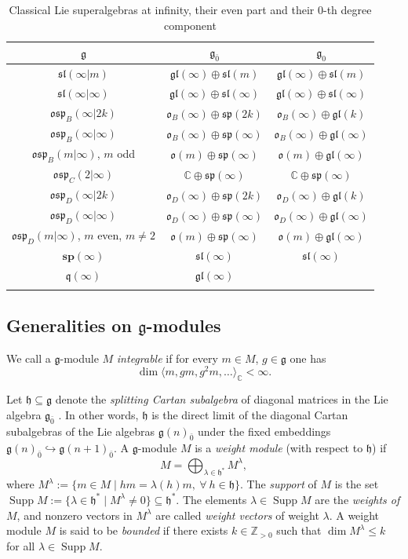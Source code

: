 \documentclass[12pt]{amsart}
\newcommand\C{\mathbb{C}}
\newcommand\Z{\mathbb{Z}}
\newcommand\g{\mathfrak{g}}
\newcommand\fq{\mathfrak{q}}
\newcommand\fh{\mathfrak{h}}
\newcommand\fsl{\mathfrak{sl}}
\newcommand\fsp{\mathfrak{sp}}
\newcommand\fosp{\mathfrak{osp}}
\newcommand\fo{\mathfrak{o}}
\newcommand\fgl{\mathfrak{gl}}
\newcommand\bsp{\mathbf{sp}}
\DeclareMathOperator{\Supp}{Supp} %
\theoremstyle{plain}
\theoremstyle{definition}
\numberwithin{equation}{section}
\begin{document}
\begin{table}
\begin{tabular}{c  c c}
\toprule
$\g$ & $\g_{\bar 0}$ & $\g_0$ \\
\midrule
$\fsl(\infty|m)$ & $\fgl(\infty)\oplus \fsl(m)$ & $\fgl(\infty)\oplus \fsl(m)$ \\
$\fsl(\infty | \infty)$ & $\fgl(\infty)\oplus \fsl(\infty)$ & $\fgl(\infty)\oplus \fsl(\infty)$ \\
$\fosp_B(\infty|2k)$ & $\fo_B(\infty)\oplus \fsp(2k)$ & $\fo_B(\infty)\oplus \fgl(k)$ \\
$\fosp_B(\infty|\infty)$ & $\fo_B(\infty)\oplus \fsp(\infty)$ & $\fo_B(\infty)\oplus \fgl(\infty)$ \\
$\fosp_B(m|\infty)$, $m$ odd & $\fo(m)\oplus \fsp(\infty)$ & $\fo(m)\oplus \fgl(\infty)$ \\
$\fosp_C(2|\infty)$ & $\C\oplus \fsp(\infty)$ & $\C\oplus \fsp(\infty)$ \\
$\fosp_D(\infty|2k)$ & $\fo_D(\infty)\oplus \fsp(2k)$ & $\fo_D(\infty)\oplus \fgl(k)$ \\
$\fosp_D(\infty|\infty)$ & $\fo_D(\infty)\oplus \fsp(\infty)$ & $\fo_D(\infty)\oplus \fgl(\infty)$ \\
$\fosp_D(m|\infty)$, $m$ even, $m\neq 2$ & $\fo(m)\oplus \fsp(\infty)$ & $\fo(m)\oplus \fgl(\infty)$ \\
$\bsp(\infty)$ & $\fsl(\infty)$ & $\fsl(\infty)$ \\
$\fq(\infty)$ & $\fgl(\infty)$ & \\
\bottomrule
\smallskip
\end{tabular}
\caption{Classical Lie superalgebras at infinity, their even part and their 0-th degree component} \label{table1}
\end{table}

\subsection{Generalities on $\g$-modules}
We call a $\g$-module $M$ \emph{integrable} if for every $m\in M$, $g\in \g$ one has 
	\[
\dim \langle m, gm, g^2m, \ldots\rangle_\C<\infty.
	\]

Let $\fh\subseteq \g$ denote the \emph{splitting Cartan subalgebra} of diagonal matrices in the Lie algebra $\g_{\bar 0}$ \cite{D-CPS07}. In other words, $\fh$ is the direct limit of the diagonal Cartan subalgebras of the Lie algebras $\g(n)_{\bar 0}$ under the fixed embeddings $\g(n)_{\bar 0}\hookrightarrow  \g(n+1)_{\bar 0}$. A $\g$-module $M$ is a \emph{weight module }(with respect to $\fh$) if
	\[
M = \bigoplus_{\lambda\in \fh^*} M^\lambda,
	\]
where $M^\lambda := \{m\in M\mid hm=\lambda(h)m,\ \forall \ h\in \fh\}$. The \emph{support} of $M$ is the set $\Supp M := \{\lambda\in \fh^*\mid M^\lambda\neq 0\}\subseteq \fh^*$. The elements $\lambda\in \Supp M$ are the \emph{weights of} $M$, and nonzero vectors in $M^\lambda$ are called \emph{weight vectors} of weight $\lambda$. A weight module $M$ is said to be \emph{bounded} if there exists $k\in \Z_{>0}$ such that $\dim M^\lambda \leq k$ for all $\lambda\in \Supp M$.
\end{document}
